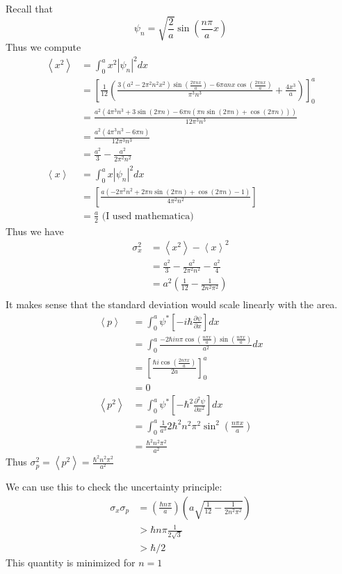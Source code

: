 \documentclass{article}
\newcommand{\ddx}[1]{\frac{\partial #1}{\partial x}}
\newcommand{\dddx}[1]{\frac{\partial^2 #1}{\partial x^2}}
\newcommand{\bracket}[1]{\left[ #1 \right]}
\newcommand{\paren}[1]{\left( #1 \right)}
\newcommand{\braket}[1]{\left\langle #1 \right\rangle}
\begin{document}
Recall that
$$\psi_n = \sqrt{\frac2a}\sin(\frac{n\pi}{a}x)$$
Thus we compute 
\begin{align*}
  \braket{x^2} &= \int_0^a x^2 |\psi_n|^2 dx \\
             &= \bracket{\frac{1}{12} \left(\frac{3 \left(a^2-2 \pi ^2 n^2 x^2\right) \sin \left(\frac{2 \pi  n x}{a}\right)-6 \pi  a n x \cos \left(\frac{2 \pi  n x}{a}\right)}{\pi ^3 n^3}+\frac{4 x^3}{a}\right)}_0^a \\
             &= \frac{a^2 \left(4 \pi ^3 n^3+3 \sin (2 \pi  n)-6 \pi  n (\pi  n \sin (2 \pi  n)+\cos (2 \pi  n))\right)}{12 \pi ^3 n^3} \\
             &= \frac{a^2(4\pi^3n^3 - 6 \pi n )}{12\pi^3n^3}  \\
             &= \frac{a^2}{3} - \frac{a^2}{2\pi^2n^2}\\ 
  \braket{x} &= \int_0^a x |\psi_n|^2 dx \\
             &= \bracket{\frac{a \left(-2 \pi ^2 n^2+2 \pi  n \sin (2 \pi  n)+\cos (2 \pi  n)-1\right)}{4 \pi ^2 n^2}} \\
             &= \frac{a}{2} \text{ (I used mathematica) }
\end{align*}
Thus we have 
\begin{align*}
  \sigma_x^2 &= \braket{x^2} - \braket{x}^2 \\
             &= \frac{a^2}{3} - \frac{a^2}{2\pi^2n^2} - \frac{a^2}4 \\
             &= a^2 \paren{\frac{1}{12} - \frac{1}{2n^2\pi^2}} \\
\end{align*}
It makes sense that the standard deviation would scale linearly with the area.
\begin{align*}
  \braket{p} &= \int_0^a \psi^* \bracket{-i\hbar \ddx{\psi}} dx \\
             &= \int_0^a \frac{-2\hbar i n \pi \cos(\frac{n \pi x}{a}) \sin(\frac{n\pi x}{a})}{a^2} dx \\
             &= \bracket{\frac{\hbar i \cos(\frac{2 n \pi x}{a})}{2a}}_0^a \\
             &= 0  \\
  \braket{p^2} &= \int_0^a \psi^* \bracket{-\hbar^2 \dddx{\psi}} dx \\
               &= \int_0^a \frac{1}{a^3} 2\hbar^2 n^2 \pi^2 \sin^2(\frac{n\pi x}{a}) \\
               &= \frac{\hbar^2 n^2 \pi^2}{a^2}
\end{align*}
Thus $\sigma_p^2 = \braket{p^2} = \frac{\hbar^2 n^2 \pi^2}{a^2}$

We can use this to check the uncertainty principle:
\begin{align*}
  \sigma_x \sigma_p &= \paren{\frac{\hbar n \pi}a} \paren{a \sqrt{\frac{1}{12} - \frac{1}{2n^2\pi^2}}} \\
                    &> \hbar n \pi \frac{1}{2\sqrt{3}} \\
                    &> \hbar / 2
\end{align*}
This quantity is minimized for $n = 1$
\end{document}

